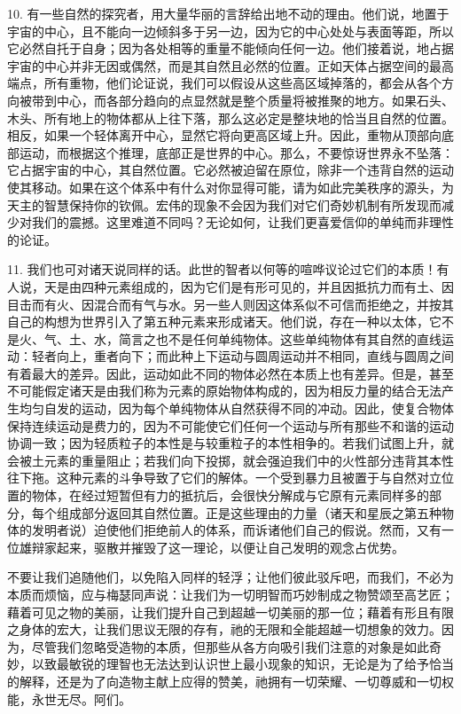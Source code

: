 10. 有一些自然的探究者，用大量华丽的言辞给出地不动的理由。他们说，地置于宇宙的中心，且不能向一边倾斜多于另一边，因为它的中心处处与表面等距，所以它必然自托于自身；因为各处相等的重量不能倾向任何一边。他们接着说，地占据宇宙的中心并非无因或偶然，而是其自然且必然的位置。正如天体占据空间的最高端点，所有重物，他们论证说，我们可以假设从这些高区域掉落的，都会从各个方向被带到中心，而各部分趋向的点显然就是整个质量将被推聚的地方。如果石头、木头、所有地上的物体都从上往下落，那么这必定是整块地的恰当且自然的位置。相反，如果一个轻体离开中心，显然它将向更高区域上升。因此，重物从顶部向底部运动，而根据这个推理，底部正是世界的中心。那么，不要惊讶世界永不坠落：它占据宇宙的中心，其自然位置。它必然被迫留在原位，除非一个违背自然的运动使其移动。如果在这个体系中有什么对你显得可能，请为如此完美秩序的源头，为天主的智慧保持你的钦佩。宏伟的现象不会因为我们对它们奇妙机制有所发现而减少对我们的震撼。这里难道不同吗？无论如何，让我们更喜爱信仰的单纯而非理性的论证。\par

11. 我们也可对诸天说同样的话。此世的智者以何等的喧哗议论过它们的本质！有人说，天是由四种元素组成的，因为它们是有形可见的，并且因抵抗力而有土、因目击而有火、因混合而有气与水。另一些人则因这体系似不可信而拒绝之，并按其自己的构想为世界引入了第五种元素来形成诸天。他们说，存在一种以太体，它不是火、气、土、水，简言之也不是任何单纯物体。这些单纯物体有其自然的直线运动：轻者向上，重者向下；而此种上下运动与圆周运动并不相同，直线与圆周之间有着最大的差异。因此，运动如此不同的物体必然在本质上也有差异。但是，甚至不可能假定诸天是由我们称为元素的原始物体构成的，因为相反力量的结合无法产生均匀自发的运动，因为每个单纯物体从自然获得不同的冲动。因此，使复合物体保持连续运动是费力的，因为不可能使它们任何一个运动与所有那些不和谐的运动协调一致；因为轻质粒子的本性是与较重粒子的本性相争的。若我们试图上升，就会被土元素的重量阻止；若我们向下投掷，就会强迫我们中的火性部分违背其本性往下拖。这种元素的斗争导致了它们的解体。一个受到暴力且被置于与自然对立位置的物体，在经过短暂但有力的抵抗后，会很快分解成与它原有元素同样多的部分，每个组成部分返回其自然位置。正是这些理由的力量（诸天和星辰之第五种物体的发明者说）迫使他们拒绝前人的体系，而诉诸他们自己的假说。然而，又有一位雄辩家起来，驱散并摧毁了这一理论，以便让自己发明的观念占优势。\par

不要让我们追随他们，以免陷入同样的轻浮；让他们彼此驳斥吧，而我们，不必为本质而烦恼，应与梅瑟同声说：让我们为一切明智而巧妙制成之物赞颂至高艺匠；藉着可见之物的美丽，让我们提升自己到超越一切美丽的那一位；藉着有形且有限之身体的宏大，让我们思议无限的存有，祂的无限和全能超越一切想象的效力。因为，尽管我们忽略受造物的本质，但那些从各方向吸引我们注意的对象是如此奇妙，以致最敏锐的理智也无法达到认识世上最小现象的知识，无论是为了给予恰当的解释，还是为了向造物主献上应得的赞美，祂拥有一切荣耀、一切尊威和一切权能，永世无尽。阿们。\par

